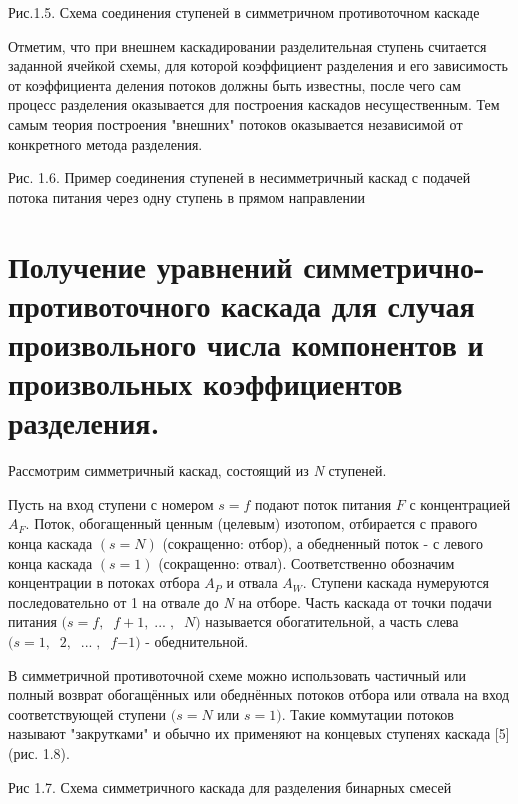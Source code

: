 
Рис.1.5. Схема соединения ступеней в симметричном противоточном каскаде



Отметим, что при внешнем каскадировании разделительная ступень считается заданной ячейкой схемы, для которой коэффициент разделения и его зависимость от коэффициента деления потоков должны быть известны, после чего сам процесс разделения оказывается для построения каскадов несущественным. Тем самым теория построения "внешних" потоков оказывается независимой от конкретного метода разделения.



\noindent Рис. 1.6. Пример соединения ступеней в несимметричный каскад с подачей потока питания через одну ступень в прямом направлении


\section{Получение уравнений симметрично-противоточного каскада для случая произвольного числа компонентов и произвольных коэффициентов разделения.}

Рассмотрим симметричный каскад, состоящий из \textit{N} ступеней. 

Пусть на вход ступени с номером $s=f$ подают поток питания $F$ с концентрацией $A_{F} $. Поток, обогащенный ценным (целевым) изотопом, отбирается с правого конца каскада $(s=N)$ (сокращенно: отбор), а обедненный поток - с левого конца каскада $(s=1)$ (сокращенно: отвал). Соответственно обозначим концентрации в потоках отбора $A_{P} $ и отвала $A_{W} $. Ступени каскада нумеруются последовательно от 1 на отвале до \textit{N} на отборе. Часть каскада от точки подачи питания $(s=f,\; \; f+1,\; { ...}\; {,}\; \; {N)}$ называется обогатительной, а часть слева $(s=1,\; \; 2,\; \; {...}\; {,}\; \; f{ -1)}$ - обеднительной.

В симметричной противоточной схеме можно использовать частичный или полный возврат обогащённых или обеднённых потоков отбора или отвала на вход соответствующей ступени $(s=N$ или $s=1)$. Такие коммутации потоков называют "закрутками" и обычно их применяют на концевых ступенях каскада [5] (рис. 1.8).




Рис 1.7. Схема симметричного каскада для разделения бинарных смесей



